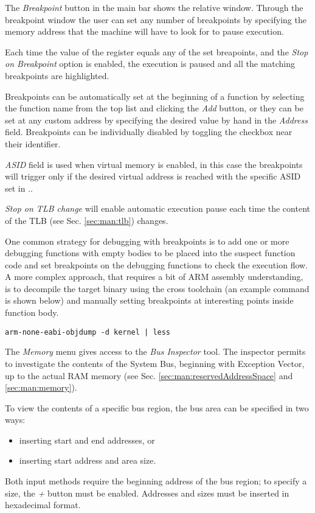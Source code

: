 \label{sec:man:breakpoints}
The \emph{Breakpoint} button in the main bar shows the relative window.
Through the breakpoint window the user can set any number of breakpoints by specifying the memory address that the machine will have to look for to pause execution.

Each time the value of the  register equals any of the set breapoints, and the \emph{Stop on Breakpoint} option is enabled, the execution is paused and all the matching breakpoints are highlighted.

Breakpoints can be automatically set at the beginning of a function by selecting the function name from the top list and clicking the \emph{Add} button, or they can be set at any custom address by specifying the desired value by hand in the \emph{Address} field.
Breakpoints can be individually disabled by toggling the checkbox near their identifier.

\emph{ASID} field is used when virtual memory is enabled, in this case the breakpoints will trigger only if the desired virtual address is reached with the specific ASID set in ..

\emph{Stop on TLB change} will enable automatic execution pause each time the content of the TLB (see Sec. \ref{sec:man:tlb}) changes.

One common strategy for debugging with breakpoints is to add one or more debugging functions with empty bodies to be placed into the suspect function code and set breakpoints on the debugging functions to check the execution flow.
A more complex approach, that requires a bit of ARM assembly understanding, is to decompile the target binary using the cross toolchain (an example command is shown below) and manually setting breakpoints at interesting points inside function body.

\begin{lstlisting}
arm-none-eabi-objdump -d kernel | less
\end{lstlisting}

\label{sec:man:busInspector}

The \emph{Memory} menu gives access to the \emph{Bus Inspector} tool.
The inspector permits to investigate the contents of the System Bus, beginning with Exception Vector, up to the actual RAM memory (see Sec. \ref{sec:man:reservedAddressSpace} and \ref{sec:man:memory}).

To view the contents of a specific bus region, the bus area can be specified in two ways:
\begin{itemize}
	\item inserting start and end addresses, or
	\item inserting start address and area size.
\end{itemize}
Both input methods require the beginning address of the bus region; to specify a size, the \emph{+} button must be enabled.
Addresses and sizes must be inserted in hexadecimal format.

